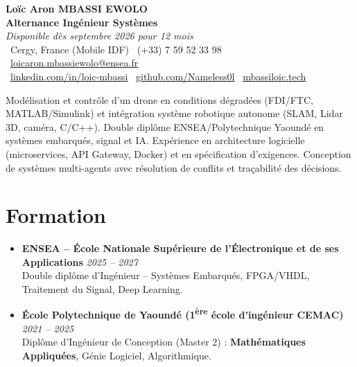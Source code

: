 \documentclass[a4paper,11pt]{article}
\begin{document}
\begin{center}
    {\Large \textbf{Loïc Aron MBASSI EWOLO}} \\ \vspace{4pt}
    \textbf{\large Alternance Ingénieur Systèmes} \\
    \textit{\small Disponible dès septembre 2026 pour 12 mois} \\ \vspace{4pt}
    \small
    \faMapMarker\ Cergy, France (Mobile IDF) \quad
    \faPhone\ (+33) 7 59 52 33 98 \quad
    {\color{primary}\faEnvelope\ \href{mailto:loicaron.mbassiewolo@ensea.fr}{loicaron.mbassiewolo@ensea.fr}} \\ \vspace{2pt}
    {\color{primary}\faLinkedin\ \href{https://www.linkedin.com/in/loic-mbassi/}{linkedin.com/in/loic-mbassi}} \quad
    {\color{primary}\faGithub\ \href{https://github.com/Nameless0l}{github.com/Nameless0l}} \quad
    {\color{primary}\faGlobe\ \href{https://mbassiloic.tech}{mbassiloic.tech}}
\end{center}

\vspace{-6pt}

\noindent\small{Modélisation et contrôle d'un drone en conditions dégradées (FDI/FTC, MATLAB/Simulink) et intégration système robotique autonome (SLAM, Lidar 3D, caméra, C/C++). Double diplôme ENSEA/Polytechnique Yaoundé en systèmes embarqués, signal et IA. Expérience en architecture logicielle (microservices, API Gateway, Docker) et en spécification d'exigences. Conception de systèmes multi-agents avec résolution de conflits et traçabilité des décisions.}

\section{Formation}
\begin{itemize}[leftmargin=*, label=\tiny$\bullet$, nosep]
    \item \textbf{ENSEA -- École Nationale Supérieure de l'Électronique et de ses Applications} \hfill \textit{2025 -- 2027} \\
    \small{Double diplôme d'Ingénieur -- Systèmes Embarqués, FPGA/VHDL, Traitement du Signal, Deep Learning.}
    \item \textbf{École Polytechnique de Yaoundé (1\textsuperscript{ère} école d'ingénieur CEMAC)} \hfill \textit{2021 -- 2025} \\
    \small{Diplôme d'Ingénieur de Conception (Master 2) : \textbf{Mathématiques Appliquées}, Génie Logiciel, Algorithmique.}
\end{itemize}
\end{document}
